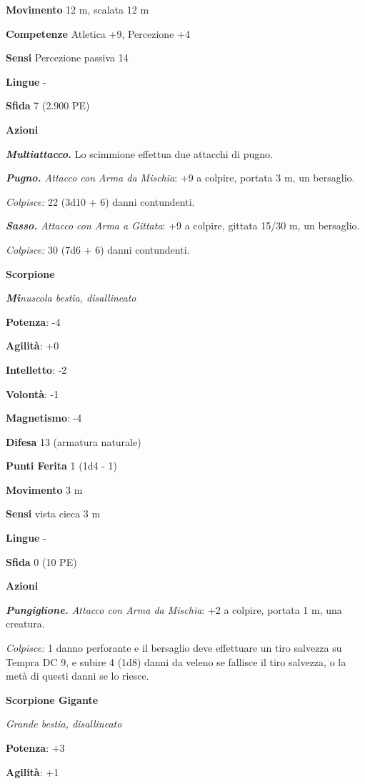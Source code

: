 \begin{multicols}{2}
\textbf{Movimento} 12 m, scalata 12 m

\textbf{Competenze} Atletica +9, Percezione +4

\textbf{Sensi} Percezione passiva 14

\textbf{Lingue} -

\textbf{Sfida} 7 (2.900 PE)\smallskip

\smallskip\textbf{Azioni}

\emph{\textbf{Multiattacco.}} Lo scimmione effettua due attacchi di
pugno.

\emph{\textbf{Pugno.} Attacco con Arma da Mischia}: +9 a colpire,
portata 3 m, un bersaglio.

\emph{Colpisce:} 22 (3d10 + 6) danni contundenti.

\emph{\textbf{Sasso.} Attacco con Arma a Gittata}: +9 a colpire, gittata
15/30 m, un bersaglio.

\emph{Colpisce:} 30 (7d6 + 6) danni contundenti.

\textbf{Scorpione}

\emph{\textbf{Mi}nuscola bestia, disallineato}

\textbf{Potenza}: -4

\textbf{Agilità}: +0

\textbf{Intelletto}: -2

\textbf{Volontà}: -1

\textbf{Magnetismo}: -4

\textbf{Difesa} 13 (armatura naturale)

\textbf{Punti Ferita} 1 (1d4 - 1)

\textbf{Movimento} 3 m

\textbf{Sensi} vista cieca 3 m

\textbf{Lingue} -

\textbf{Sfida} 0 (10 PE)\smallskip

\smallskip\textbf{Azioni}

\emph{\textbf{Pungiglione.} Attacco con Arma da Mischia}: +2 a colpire,
portata 1 m, una creatura.

\emph{Colpisce:} 1 danno perforante e il bersaglio deve effettuare un
tiro salvezza su Tempra DC 9, e subire 4 (1d8) danni da veleno se
fallisce il tiro salvezza, o la metà di questi danni se lo riesce.

\textbf{Scorpione Gigante}

\emph{Grande bestia, disallineato}

\textbf{Potenza}: +3

\textbf{Agilità}: +1


\end{multicols}
